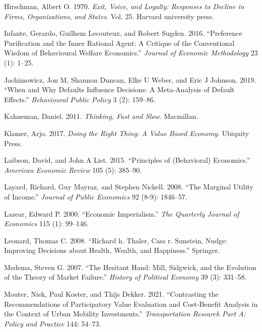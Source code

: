 \documentclass[
]{book}
\newlength{\cslhangindent}
\newlength{\cslentryspacingunit} %
\newenvironment{CSLReferences}[2] %
 {%
  \setlength{\parindent}{0pt}
  \ifodd #1
  \let\oldpar\par
  \def\par{\hangindent=\cslhangindent\oldpar}
  \fi
  \setlength{\parskip}{#2\cslentryspacingunit}
 }%
 {}
\begin{document}
\begin{CSLReferences}{1}{0}
\leavevmode{}%
Hirschman, Albert O. 1970. \emph{Exit, Voice, and Loyalty: Responses to Decline in Firms, Organizations, and States}. Vol. 25. Harvard university press.

\leavevmode{}%
Infante, Gerardo, Guilhem Lecouteux, and Robert Sugden. 2016. {``Preference Purification and the Inner Rational Agent: A Critique of the Conventional Wisdom of Behavioural Welfare Economics.''} \emph{Journal of Economic Methodology} 23 (1): 1--25.

\leavevmode{}%
Jachimowicz, Jon M, Shannon Duncan, Elke U Weber, and Eric J Johnson. 2019. {``When and Why Defaults Influence Decisions: A Meta-Analysis of Default Effects.''} \emph{Behavioural Public Policy} 3 (2): 159--86.

\leavevmode{}%
Kahneman, Daniel. 2011. \emph{Thinking, Fast and Slow}. Macmillan.

\leavevmode{}%
Klamer, Arjo. 2017. \emph{Doing the Right Thing: A Value Based Economy}. Ubiquity Press.

\leavevmode{}%
Laibson, David, and John A List. 2015. {``Principles of (Behavioral) Economics.''} \emph{American Economic Review} 105 (5): 385--90.

\leavevmode{}%
Layard, Richard, Guy Mayraz, and Stephen Nickell. 2008. {``The Marginal Utility of Income.''} \emph{Journal of Public Economics} 92 (8-9): 1846--57.

\leavevmode{}%
Lazear, Edward P. 2000. {``Economic Imperialism.''} \emph{The Quarterly Journal of Economics} 115 (1): 99--146.

\leavevmode{}%
Leonard, Thomas C. 2008. {``Richard h. Thaler, Cass r. Sunstein, Nudge: Improving Decisions about Health, Wealth, and Happiness.''} Springer.

\leavevmode{}%
Medema, Steven G. 2007. {``The Hesitant Hand: Mill, Sidgwick, and the Evolution of the Theory of Market Failure.''} \emph{History of Political Economy} 39 (3): 331--58.

\leavevmode{}%
Mouter, Niek, Paul Koster, and Thijs Dekker. 2021. {``Contrasting the Recommendations of Participatory Value Evaluation and Cost-Benefit Analysis in the Context of Urban Mobility Investments.''} \emph{Transportation Research Part A: Policy and Practice} 144: 54--73.


\end{CSLReferences}
\end{document}
